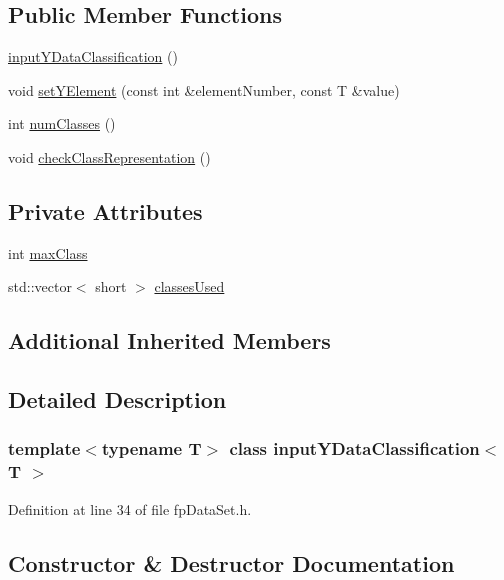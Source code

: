 \subsection*{Public Member Functions}
\begin{DoxyCompactItemize}
\item 
\hyperlink{classinputYDataClassification_ad499a9459c748f9df338fc870f6bf62b}{input\+Y\+Data\+Classification} ()
\item 
void \hyperlink{classinputYDataClassification_ae6f3f163739a75bb379dd80d7c9649a2}{set\+Y\+Element} (const int \&element\+Number, const T \&value)
\item 
int \hyperlink{classinputYDataClassification_ae090531ab57b174ab007a2a8248462fe}{num\+Classes} ()
\item 
void \hyperlink{classinputYDataClassification_a738130d6cf0ed15aff355d612aae67ca}{check\+Class\+Representation} ()
\end{DoxyCompactItemize}
\subsection*{Private Attributes}
\begin{DoxyCompactItemize}
\item 
int \hyperlink{classinputYDataClassification_a869375cfd78524833cd69aca9daf8aec}{max\+Class}
\item 
std\+::vector$<$ short $>$ \hyperlink{classinputYDataClassification_aa757e6d11b67d82357b863132155f933}{classes\+Used}
\end{DoxyCompactItemize}
\subsection*{Additional Inherited Members}


\subsection{Detailed Description}
\subsubsection*{template$<$typename T$>$\newline
class input\+Y\+Data\+Classification$<$ T $>$}



Definition at line 34 of file fp\+Data\+Set.\+h.



\subsection{Constructor \& Destructor Documentation}
\mbox{\label{classinputYDataClassification_ad499a9459c748f9df338fc870f6bf62b}} 
